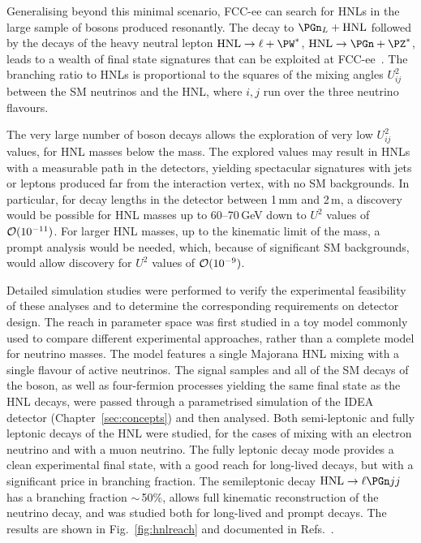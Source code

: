 Generalising beyond this minimal scenario, FCC-ee can search for HNLs in the large sample of \PZ bosons produced resonantly. 
The \PZ decay to $\PGn_L + \text{HNL}$ followed by the decays of the heavy neutral lepton 
$\text{HNL} \to \ell + \PW^*$, 
$\text{HNL} \to \PGn + \PZ^*$, 
leads to a wealth of final state signatures that can be exploited at FCC-ee~\cite{Blondel:2014bra}. 
The \PZ branching ratio to HNLs is proportional to the squares of the mixing angles $U^2_{ij}$ between the SM neutrinos and the HNL, 
where $i,j$ run over the three neutrino flavours.

The very large number of \PZ boson decays allows the exploration of very low $U^2_{ij}$ values, for HNL masses below the \PZ mass. 
The explored values  may result in HNLs with a measurable path in the detectors, 
yielding spectacular signatures with jets or leptons produced far from the interaction vertex, with no SM backgrounds. 
In particular, for decay lengths in the detector between 1\,mm and 2\,m, 
a discovery would be possible for HNL masses up to 60--70\,GeV down to $U^2$ values of ${\cal O}(10^{-11})$. 
For larger HNL masses, up to the kinematic limit of the \PZ mass, a prompt analysis would be needed, 
which, because of significant SM backgrounds, would allow discovery for $U^2$ values of ${\cal O}(10^{-9})$.

Detailed simulation studies were performed to verify the experimental feasibility of these analyses 
and to determine the corresponding requirements on detector design. 
The reach in parameter space was first studied in a toy model commonly used to compare different experimental approaches, 
rather than a complete model for neutrino masses. 
The model features a single Majorana HNL mixing with a single flavour of active neutrinos. 
The signal samples and all of the SM decays of the \PZ boson, 
as well as four-fermion processes yielding the same final state as the HNL decays, 
were passed through a parametrised simulation of the IDEA detector (Chapter~\ref{sec:concepts}) and then analysed. 
Both semi-leptonic and fully leptonic decays of the HNL were studied, 
for the cases of mixing with an electron neutrino and with a muon neutrino. 
The fully leptonic decay mode provides a clean experimental final state, 
with a good reach for long-lived decays, but with a significant price in branching fraction. 
The semileptonic decay $\text{HNL} \to \ell \PGn j j$ has a branching fraction $\sim$\,50\%, 
allows full kinematic reconstruction of the neutrino decay, 
and was studied both for long-lived and prompt decays. 
The results are shown in Fig.~\ref{fig:hnlreach} and documented in 
Refs.~\cite{MSc_Moulin, MSc_Critchley, note_HNL_Polesello_Valle_mujj,Blondel:2022qqo, 
note_HNL_Presilla_Giappichini,note_HNL_Williams}. 

